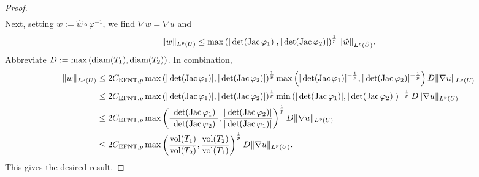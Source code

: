 \documentclass[12pt,a4paper]{article}
\begin{document}
\begin{proof}
\begin{align*}
    \end{align*}
    Next, setting $w := \hat w \circ \varphi^{-1}$, we find $\nabla w = \nabla u$ and 
    \begin{align*}
        \| w \|_{L^{p}(U)}
        \leq 
        \max\left( 
            |\det(\operatorname{{\rm Jac}} \varphi_1)|
            ,
            |\det(\operatorname{{\rm Jac}} \varphi_2)|
        \right)^{\frac 1 p}
        \| \hat w \|_{L^{p}(\hat U)}
        .
    \end{align*}
    Abbreviate $D := \max\left( {\operatorname{diam}}(T_1), {\operatorname{diam}}(T_2) \right)$. In combination, 
    \begin{align*}
        \| w \|_{L^{p}(U)}
        &\leq 
        2 C_{{\rm EFNT},p}
        \max\left( 
            |\det(\operatorname{{\rm Jac}} \varphi_1)|
            ,
            |\det(\operatorname{{\rm Jac}} \varphi_2)|
        \right)^{\frac 1 p}
        \max\left( 
            |\det(\operatorname{{\rm Jac}} \varphi_1)|^{-\frac 1 p} 
            ,
            |\det(\operatorname{{\rm Jac}} \varphi_2)|^{-\frac 1 p} 
        \right)
        D
        \| \nabla u \|_{L^{p}(U)}
        \\&
        \leq 
        2 C_{{\rm EFNT},p}
        \max\left( 
            |\det(\operatorname{{\rm Jac}} \varphi_1)|
            ,
            |\det(\operatorname{{\rm Jac}} \varphi_2)|
        \right)^{\frac 1 p}
        \min\left( 
            |\det(\operatorname{{\rm Jac}} \varphi_1)|
            ,
            |\det(\operatorname{{\rm Jac}} \varphi_2)| 
        \right)^{-\frac 1 p} 
        D
        \| \nabla u \|_{L^{p}(U)}
        \\&
        \leq 
        2 C_{{\rm EFNT},p}
        \max\left( 
            \frac{ |\det(\operatorname{{\rm Jac}} \varphi_1)| }{ |\det(\operatorname{{\rm Jac}} \varphi_2)| }
            ,
            \frac{ |\det(\operatorname{{\rm Jac}} \varphi_2)| }{ |\det(\operatorname{{\rm Jac}} \varphi_1)| }
        \right)^{\frac 1 p}
        D
        \| \nabla u \|_{L^{p}(U)}
        \\&
        \leq 
        2 C_{{\rm EFNT},p}
        \max\left( 
            \frac{ \operatorname{vol}(T_1) }{ \operatorname{vol}(T_2) }
            ,
            \frac{ \operatorname{vol}(T_2) }{ \operatorname{vol}(T_1) }
        \right)^{\frac 1 p}
        D
        \| \nabla u \|_{L^{p}(U)}
        .
    \end{align*}
    This gives the desired result. 
\end{proof}
\end{document}
